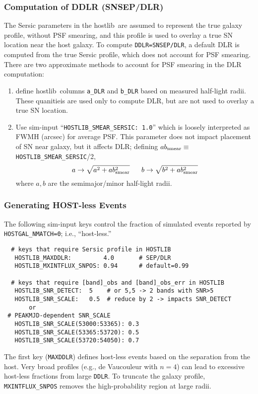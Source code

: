 \documentclass[12pt]{article}
\newcommand{\hostlib}{{\sc hostlib}}
\begin{document}
{%
\subsubsection{Computation of DDLR (SNSEP/DLR) }
\label{sss:hostlib_ddlr}

The Sersic parameters in the \hostlib\ are assumed to represent
the true galaxy profile, without PSF smearing, and this profile
is used to overlay a true SN location near the host galaxy. 
To compute {\tt DDLR=SNSEP/DLR}, a default DLR is computed from the 
true Sersic profile, which does not account for PSF smearing.
There are two approximate methods to account for PSF smearing
in the DLR computation:
%
\newcommand{\absmear}{ab_{\rm smear}}
\begin{enumerate}
   \item define \hostlib\ columns {\tt a\_DLR} and {\tt b\_DLR} based
       on measured half-light radii. These quanitieis are used only
       to compute DLR, but are not used to overlay a true SN location.
%
   \item Use sim-input ``{\tt HOSTLIB\_SMEAR\_SERSIC: 1.0}'' which
     is loosely interpreted as FWMH (arcsec) for average PSF.
     This parameter does not impact placement of SN near galaxy,
     but it affects DLR; 
     defining $\absmear\equiv${\tt HOSTLIB\_SMEAR\_SERSIC}/2,
       \begin{equation}
         a \to \sqrt{a^2 + \absmear^2} ~~~~~
         b \to \sqrt{b^2 + \absmear^2}
       \end{equation}
     where $a,b$ are the semimajor/minor half-light radii.
\end{enumerate}

\clearpage
\subsubsection{Generating HOST-less Events}

The following sim-input keys control the fraction of simulated
events reported by {\tt HOSTGAL\_NMATCH=0}; i.e., ``host-less.''
\begin{verbatim}
  # keys that require Sersic profile in HOSTLIB
   HOSTLIB_MAXDDLR:         4.0       # SEP/DLR
   HOSTLIB_MXINTFLUX_SNPOS: 0.94      # default=0.99

  # keys that require [band]_obs and [band]_obs_err in HOSTLIB
   HOSTLIB_SNR_DETECT:  5    # or 5,5 -> 2 bands with SNR>5
   HOSTLIB_SNR_SCALE:   0.5  # reduce by 2 -> impacts SNR_DETECT
       or
 # PEAKMJD-dependent SNR_SCALE
   HOSTLIB_SNR_SCALE(53000:53365): 0.3
   HOSTLIB_SNR_SCALE(53365:53720): 0.5
   HOSTLIB_SNR_SCALE(53720:54050): 0.7
\end{verbatim}
%
The first key ({\tt MAXDDLR}) defines host-less events based on
the separation from the host. 
Very broad profiles (e.g., de Vaucouleur with $n=4$) can lead
to excessive host-less fractions from large {\tt DDLR}.
To truncate the galaxy profile, {\tt MXINTFLUX\_SNPOS} removes
the high-probability region at large radii.

}
\end{document}
